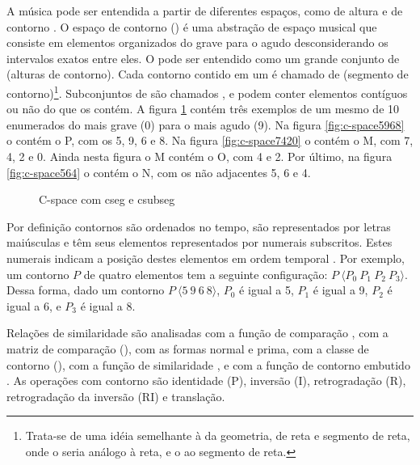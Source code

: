 A música pode ser entendida a partir de diferentes espaços, como de
altura e de contorno \cite{morris87:composition}. O espaço de contorno
() é uma abstração de espaço musical que consiste em
elementos organizados do grave para o agudo desconsiderando os
intervalos exatos entre eles. O  pode ser entendido
como um grande conjunto de  (alturas de contorno). Cada
contorno contido em um  é chamado de 
(segmento de contorno)\footnote{Trata-se de uma idéia semelhante à da
  geometria, de reta e segmento de reta, onde o  seria
  análogo à reta, e o  ao segmento de reta.}. Subconjuntos
de  são chamados , e podem conter elementos
contíguos ou não do  que os contém. A figura
\ref{fig:c-space} contém três exemplos de um mesmo  de
10  enumerados do mais grave (0) para o mais agudo
(9). Na figura \ref{fig:c-space5968} o  contém o
 P, com os  5, 9, 6 e 8. Na figura
\ref{fig:c-space7420} o  contém o  M, com
 7, 4, 2 e 0. Ainda nesta figura o  M
contém o  O, com  4 e 2. Por último, na
figura \ref{fig:c-space564} o  contém o  N,
com os  não adjacentes 5, 6 e 4.

\begin{figure}
  \centering
  \caption{C-space com cseg e csubseg}
  \label{fig:c-space}
\end{figure}

Por definição contornos são ordenados no tempo, são representados por
letras maiúsculas e têm seus elementos representados por numerais
subscritos. Estes numerais indicam a posição destes elementos em ordem
temporal \cite{marvin.ea87:relating}. Por exemplo, um contorno $P$ de
quatro elementos tem a seguinte configuração: $P\:\langle
P_0\:P_1\:P_2\:P_3\rangle$. Dessa forma, dado um contorno
$P\:\langle5\:9\:6\:8\rangle$, $P_0$ é igual a 5, $P_1$ é igual a 9,
$P_2$ é igual a 6, e $P_3$ é igual a 8.

Relações de similaridade \cite{marvin.ea87:relating} são analisadas
com a função de comparação , com a matriz de comparação
(), com as formas normal e prima, com a classe de
contorno (), com a função de similaridade , e
com a função de contorno embutido . As operações com
contorno são identidade (P), inversão (I), retrogradação (R),
retrogradação da inversão (RI) e translação.


